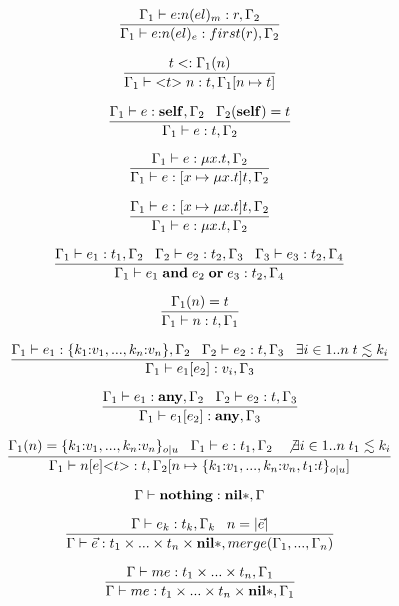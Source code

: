 \[
\dfrac{\Gamma_{1} \vdash e{:}n(el)_{m}:r, \Gamma_{2}}
      {\Gamma_{1} \vdash e{:}n(el)_{e}:first(r), \Gamma_{2}}
\]

\[
\dfrac{t <: \Gamma_{1}(n)}
      {\Gamma_{1} \vdash {<}t{>} \; n:t, \Gamma_{1}[n \mapsto t]}
\]

\[
\dfrac{\Gamma_{1} \vdash e:\mathbf{self}, \Gamma_{2} \;\;\;
       \Gamma_{2}(\mathbf{self}) = t}
      {\Gamma_{1} \vdash e:t, \Gamma_{2}}
\]

\[
\dfrac{\Gamma_{1} \vdash e:\mu x.t, \Gamma_{2}}
      {\Gamma_{1} \vdash e:[x \mapsto \mu x.t]t, \Gamma_{2}}
\]

\[
\dfrac{\Gamma_{1} \vdash e:[x \mapsto \mu x.t]t, \Gamma_{2}}
      {\Gamma_{1} \vdash e:\mu x.t, \Gamma_{2}}
\]

\[
\dfrac{\Gamma_{1} \vdash e_{1}:t_{1}, \Gamma_{2} \;\;\;
       \Gamma_{2} \vdash e_{2}:t_{2}, \Gamma_{3} \;\;\;
       \Gamma_{3} \vdash e_{3}:t_{2}, \Gamma_{4}}
      {\Gamma_{1} \vdash e_{1} \; \mathbf{and} \; e_{2} \; \mathbf{or} \; e_{3}:t_{2}, \Gamma_{4}}
\]

\[
\dfrac{\Gamma_{1}(n) = t}
      {\Gamma_{1} \vdash n:t, \Gamma_{1}}
\]

\[
\dfrac{\Gamma_{1} \vdash e_{1}:\{k_{1}{:}v_{1}, ..., k_{n}{:}v_{n}\}, \Gamma_{2} \;\;\;
       \Gamma_{2} \vdash e_{2}:t, \Gamma_{3} \;\;\;
       \exists i \in 1{..}n \; t \lesssim k_{i}}
      {\Gamma_{1} \vdash e_{1}[e_{2}]:v_{i}, \Gamma_{3}}
\]

\[
\dfrac{\Gamma_{1} \vdash e_{1}:\mathbf{any}, \Gamma_{2} \;\;\;
       \Gamma_{2} \vdash e_{2}:t, \Gamma_{3}}
      {\Gamma_{1} \vdash e_{1}[e_{2}]:\mathbf{any}, \Gamma_{3}}
\]

\[
\dfrac{\Gamma_{1}(n) = \{ k_{1}{:}v_{1}, ..., k_{n}{:}v_{n} \}_{o|u} \;\;\;
       \Gamma_{1} \vdash e:t_{1}, \Gamma_{2} \;\;\;
       \not \exists i \in 1..n \; t_{1} \lesssim k_{i}}
      {\Gamma_{1} \vdash n[e] {<}t{>}:t, \Gamma_{2}[n \mapsto \{ k_{1}{:}v_{1}, ..., k_{n}{:}v_{n}, t_{1}{:}t\}_{o|u}]}
\]

\[
\Gamma \vdash \mathbf{nothing}:\mathbf{nil}{*}, \Gamma
\]

\[
\dfrac{\Gamma \vdash e_{k}:t_{k}, \Gamma_{k} \;\;\;
       n = |\vec{e}|}
      {\Gamma \vdash \vec{e}:t_{1} \times ... \times t_{n} \times \mathbf{nil}{*}, merge(\Gamma_{1}, ..., \Gamma_{n})}
\]

\[
\dfrac{\Gamma \vdash me:t_{1} \times ... \times t_{n}, \Gamma_{1}}
      {\Gamma \vdash me:t_{1} \times ... \times t_{n} \times \mathbf{nil}{*}, \Gamma_{1}}
\]

